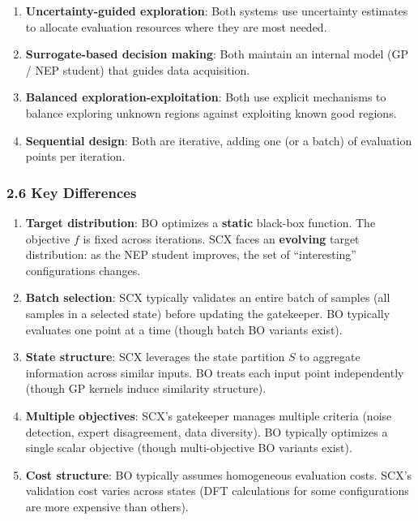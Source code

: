 \documentclass[
  12pt,
]{article}
\providecommand{\tightlist}{%
  \setlength{\itemsep}{0pt}\setlength{\parskip}{0pt}}
\begin{document}
\begin{enumerate}
\def\labelenumi{\arabic{enumi}.}
\tightlist
\item
  \textbf{Uncertainty-guided exploration}: Both systems use uncertainty
  estimates to allocate evaluation resources where they are most needed.
\item
  \textbf{Surrogate-based decision making}: Both maintain an internal
  model (GP / NEP student) that guides data acquisition.
\item
  \textbf{Balanced exploration-exploitation}: Both use explicit
  mechanisms to balance exploring unknown regions against exploiting
  known good regions.
\item
  \textbf{Sequential design}: Both are iterative, adding one (or a
  batch) of evaluation points per iteration.
\end{enumerate}

\subsubsection{2.6 Key Differences}\label{key-differences-1}

\begin{enumerate}
\def\labelenumi{\arabic{enumi}.}
\item
  \textbf{Target distribution}: BO optimizes a \textbf{static} black-box
  function. The objective \(f\) is fixed across iterations. SCX faces an
  \textbf{evolving} target distribution: as the NEP student improves,
  the set of ``interesting'' configurations changes.
\item
  \textbf{Batch selection}: SCX typically validates an entire batch of
  samples (all samples in a selected state) before updating the
  gatekeeper. BO typically evaluates one point at a time (though batch
  BO variants exist).
\item
  \textbf{State structure}: SCX leverages the state partition \(S\) to
  aggregate information across similar inputs. BO treats each input
  point independently (though GP kernels induce similarity structure).
\item
  \textbf{Multiple objectives}: SCX's gatekeeper manages multiple
  criteria (noise detection, expert disagreement, data diversity). BO
  typically optimizes a single scalar objective (though multi-objective
  BO variants exist).
\item
  \textbf{Cost structure}: BO typically assumes homogeneous evaluation
  costs. SCX's validation cost varies across states (DFT calculations
  for some configurations are more expensive than others).
\end{enumerate}
\end{document}
